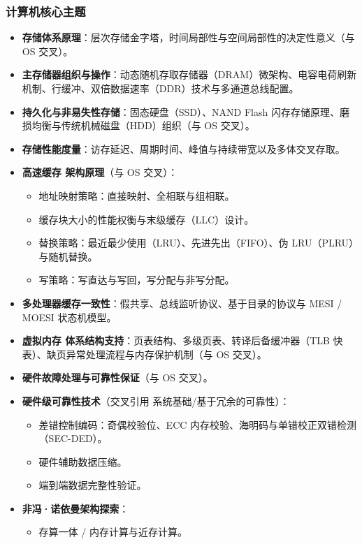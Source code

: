 \subsubsection{计算机核心主题}
\begin{itemize}
    \item \textbf{存储体系原理}：层次存储金字塔，时间局部性与空间局部性的决定性意义（与 OS 交叉）。
    \item \textbf{主存储器组织与操作}：动态随机存取存储器（DRAM）微架构、电容电荷刷新机制、行缓冲、双倍数据速率（DDR）技术与多通道总线配置。
    \item \textbf{持久化与非易失性存储}：固态硬盘（SSD）、NAND Flash 闪存存储原理、磨损均衡与传统机械磁盘（HDD）组织（与 OS 交叉）。
    \item \textbf{存储性能度量}：访存延迟、周期时间、峰值与持续带宽以及多体交叉存取。
    \item \textbf{高速缓存 架构原理}（与 OS 交叉）：
    \begin{itemize}
        \item 地址映射策略：直接映射、全相联与组相联。
        \item 缓存块大小的性能权衡与末级缓存（LLC）设计。
        \item 替换策略：最近最少使用（LRU）、先进先出（FIFO）、伪 LRU（PLRU）与随机替换。
        \item 写策略：写直达与写回，写分配与非写分配。
    \end{itemize}
    \item \textbf{多处理器缓存一致性}：假共享、总线监听协议、基于目录的协议与 MESI / MOESI 状态机模型。
    \item \textbf{虚拟内存 体系结构支持}：页表结构、多级页表、转译后备缓冲器（TLB 快表）、缺页异常处理流程与内存保护机制（与 OS 交叉）。
    \item \textbf{硬件故障处理与可靠性保证}（与 OS 交叉）。
    \item \textbf{硬件级可靠性技术}（交叉引用 系统基础/基于冗余的可靠性）：
    \begin{itemize}
        \item 差错控制编码：奇偶校验位、ECC 内存校验、海明码与单错校正双错检测（SEC-DED）。
        \item 硬件辅助数据压缩。
        \item 端到端数据完整性验证。
    \end{itemize}
    \item \textbf{非冯·诺依曼架构探索}：
    \begin{itemize}
        \item 存算一体 / 内存计算与近存计算。
    \end{itemize}
\end{itemize}

